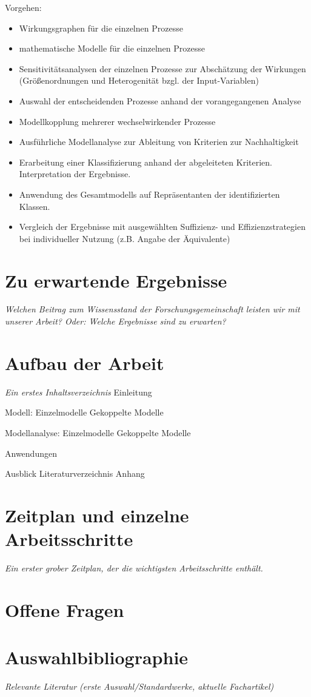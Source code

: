 \documentclass[11pt, titlepage=true]{scrartcl} %
\newcommand{\was}[1]{\small\textit{#1}}
\begin{document}
Vorgehen:
\begin{itemize}
	\item Wirkungsgraphen für die einzelnen Prozesse
	\item mathematische Modelle für die einzelnen Prozesse
	\item Sensitivitätsanalysen der einzelnen Prozesse zur Abschätzung der Wirkungen (Größenordnungen und Heterogenität bzgl. der Input-Variablen)
	\item Auswahl der entscheidenden Prozesse anhand der vorangegangenen Analyse
	\item Modellkopplung mehrerer wechselwirkender Prozesse
	\item Ausführliche Modellanalyse zur Ableitung von Kriterien zur Nachhaltigkeit
	\item Erarbeitung einer Klassifizierung anhand der abgeleiteten Kriterien. Interpretation der Ergebnisse.
	\item Anwendung des Gesamtmodells auf Repräsentanten der identifizierten Klassen.
	\item Vergleich der Ergebnisse mit ausgewählten Suffizienz- und Effizienzstrategien bei individueller Nutzung (z.B. Angabe der Äquivalente)
\end{itemize}


\section{Zu erwartende Ergebnisse}
\was{Welchen Beitrag zum Wissensstand der Forschungsgemeinschaft leisten wir mit
unserer Arbeit?
Oder: Welche Ergebnisse sind zu erwarten?}


\section{Aufbau der Arbeit}
\was{Ein erstes Inhaltsverzeichnis}
Einleitung

Modell:
Einzelmodelle
Gekoppelte Modelle

Modellanalyse:
Einzelmodelle
Gekoppelte Modelle

Anwendungen

Ausblick
Literaturverzeichnis
Anhang

\section{Zeitplan und einzelne Arbeitsschritte}
\was{Ein erster grober Zeitplan, der die wichtigsten Arbeitsschritte enthält.}

\section{Offene Fragen}

\section{Auswahlbibliographie}
\was{Relevante Literatur (erste Auswahl/Standardwerke, aktuelle Fachartikel)}

\end{document}
